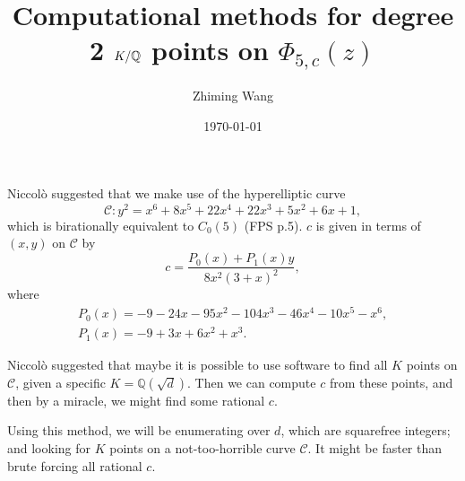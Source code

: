\documentclass{amsart}
\title{Computational methods for degree 2 $K/\Q$ points on
  $\Phi_{5,c}(z)$}
\author{Zhiming Wang}
\date{\today}
\theoremstyle{plain}
\theoremstyle{definition}
\theoremstyle{remark}
\newcommand{\Q}{\mathbb{Q}}
\begin{document}
\maketitle

Niccol\`o suggested that we make use of the hyperelliptic curve
\[
\mathcal{C}: y^2 = x^6 + 8x^5 + 22x^4 + 22x^3 + 5x^2 + 6x + 1,
\]
which is birationally equivalent to $C_0(5)$ (FPS p.5). $c$ is given
in terms of $(x, y)$ on $\mathcal{C}$ by
\[
c = \frac{P_0(x) + P_1(x) y}{8x^2(3+x)^2},
\]
where
\[
\begin{gathered}
  P_0(x) = -9 - 24x - 95x^2 - 104x^3 - 46x^4 - 10x^5 - x^6,\\
  P_1(x) = -9 + 3x + 6x^2 + x^3.
\end{gathered}
\]

Niccol\`o suggested that maybe it is possible to use software to find
all $K$ points on $\mathcal{C}$, given a specific $K =
\Q(\sqrt{d})$. Then we can compute $c$ from these points, and then by
a miracle, we might find some rational $c$.

Using this method, we will be enumerating over $d$, which are
squarefree integers; and looking for $K$ points on a
not-too-horrible curve $\mathcal{C}$. It might be faster than brute
forcing all rational $c$.
\end{document}
